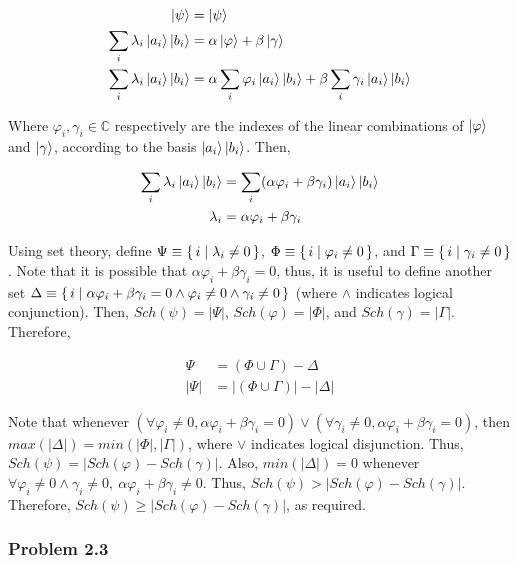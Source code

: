 \begin{enumerate}
    \begin{align}
        \ket{\psi} &= \ket{\psi} \\
        \sum_i \lambda_i \ket{a_i} \ket{b_i} &= \alpha \ket{\varphi} + \beta \ket{\gamma} \\
        \sum_i \lambda_i \ket{a_i} \ket{b_i} &=
            \alpha \sum_i \varphi_i \ket{a_i} \ket{b_i} + \beta \sum_i \gamma_i \ket{a_i} \ket{b_i} \\
    \end{align}
    
    Where $\varphi_i, \gamma_i \in \mathbb{C}$ respectively are the indexes of the linear combinations
    of $\ket{\varphi}$ and $\ket{\gamma}$, according to the basis $\ket{a_i} \ket{b_i}$.
    Then,
    
    \begin{align}
        \sum_i \lambda_i \ket{a_i} \ket{b_i} &=
            \sum_i (\alpha \varphi_i + \beta \gamma_i) \ket{a_i} \ket{b_i} \\
        \lambda_i &= \alpha \varphi_i + \beta \gamma_i
    \end{align}
    
    Using set theory, define $\Psi \equiv \set{i \mid \lambda_i \neq 0}$,
    $\Phi \equiv \set{i \mid \varphi_i \neq 0}$, and
    $\Gamma \equiv \set{i \mid \gamma_i \neq 0}$.
    Note that it is possible that $\alpha \varphi_i + \beta \gamma_i = 0$,
    thus, it is useful to define another set
    $\Delta \equiv \set{i \mid \alpha \varphi_i + \beta \gamma_i = 0
    \land \varphi_i \neq 0 \land \gamma_i \neq 0}$
    (where $\land$ indicates logical conjunction).
    Then, $Sch(\psi) = |\Psi|$, $Sch(\varphi) = |\Phi|$, and $Sch(\gamma) = |\Gamma|$.
    Therefore,
    
    \begin{align}
        \Psi &= (\Phi \cup \Gamma) - \Delta \\
        |\Psi| &= |(\Phi \cup \Gamma)| - |\Delta|
    \end{align}
    
    Note that whenever
    $(\forall \varphi_i \neq 0, \alpha \varphi_i + \beta \gamma_i = 0) \lor
    (\forall \gamma_i \neq 0, \alpha \varphi_i + \beta \gamma_i = 0)$,
    then $max(|\Delta|) = min(|\Phi|, |\Gamma|)$,
    where $\lor$ indicates logical disjunction.
    Thus, $Sch(\psi) = |Sch(\varphi) - Sch(\gamma)|$.
    Also, $min(|\Delta|) = 0$ whenever
    $\forall \varphi_i \neq 0 \land \gamma_i \neq 0,\ \alpha \varphi_i + \beta \gamma_i \neq 0$.
    Thus, $Sch(\psi) > |Sch(\varphi) - Sch(\gamma)|$.
    Therefore, $Sch(\psi) \geq |Sch(\varphi) - Sch(\gamma)|$, as required.
    
\end{enumerate}

\subsubsection{Problem 2.3}